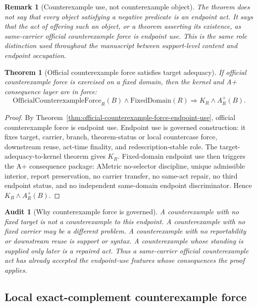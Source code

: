 \documentclass[11pt]{article}
\newtheorem{theorem}{Theorem}[section]
\newtheorem{remark}{Remark}[section]
\newtheorem{audit}{Audit}[section]
\newcommand{\OfficialCxForce}{\mathrm{OfficialCounterexampleForce}}
\newcommand{\FixedDomain}{\mathrm{FixedDomain}}
\newcommand{\Aplus}{A^+}
\begin{document}
\begin{remark}[Counterexample use, not counterexample object]
The theorem does not say that every object satisfying a negative predicate is an endpoint act. It says that the act of offering such an object, or a theorem asserting its existence, as same-carrier official counterexample force is endpoint use. This is the same role distinction used throughout the manuscript between support-level content and endpoint occupation.
\end{remark}

\begin{theorem}[Official counterexample force satisfies target adequacy]\label{thm:counterexample-force-target-adequacy}
If official counterexample force is exercised on a fixed domain, then the kernel and A+ consequence layer are in force:
\[
\OfficialCxForce_R(B)\wedge\FixedDomain(R)
\Rightarrow K_R\wedge\Aplus_R(B).
\]
\end{theorem}

\begin{proof}
By Theorem~\ref{thm:official-counterexample-force-endpoint-use}, official counterexample force is endpoint use. Endpoint use is governed construction: it fixes target, carrier, branch, theorem-status or local countercase force, downstream reuse, act-time finality, and redescription-stable role. The target-adequacy-to-kernel theorem gives \(K_R\). Fixed-domain endpoint use then triggers the A+ consequence package: AMetric no-selector discipline, unique admissible interior, report preservation, no carrier transfer, no same-act repair, no third endpoint status, and no independent same-domain endpoint discriminator. Hence \(K_R\wedge\Aplus_R(B)\).
\end{proof}

\begin{audit}[Why counterexample force is governed]
A counterexample with no fixed target is not a counterexample to this endpoint. A counterexample with no fixed carrier may be a different problem. A counterexample with no reportability or downstream reuse is support or syntax. A counterexample whose standing is supplied only later is a repaired act. Thus a same-carrier official counterexample act has already accepted the endpoint-use features whose consequences the proof applies.
\end{audit}

\subsection{Local exact-complement counterexample force}
\end{document}
